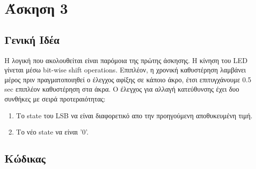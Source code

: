 \documentclass[11pt]{article}
\begin{document}
\section*{Άσκηση 3}

\subsection*{Γενική Ιδέα}
Η λογική που ακολουθείται είναι παρόμοια της πρώτης άσκησης. Η κίνηση του LED γίνεται μέσω bit-wise shift operations. Επιπλέον, η χρονική καθυστέρηση λαμβάνει μέρος πριν πραγματοποιηθεί ο έλεγχος αφίξης σε κάποιο άκρο, έτσι επιτυγχάνουμε 0.5 sec επιπλέον καθυστέρηση στα άκρα. Ο έλεγχος για αλλαγή κατεύθυνσης έχει δυο συνθήκες με σειρά προτεραιότητας:
\begin{enumerate}
    \item Το state του LSB να είναι διαφορετικό απο την προηγούμενη αποθυκευμένη τιμή.
    \item Το νέο state να είναι '0'.
\end{enumerate}
\subsection*{Κώδικας}
\end{document}
